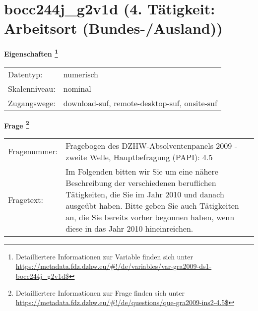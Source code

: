 
    \setcounter{footnote}{0}

    \vspace*{-1.8cm}
	\section{bocc244j\_g2v1d (4. Tätigkeit: Arbeitsort (Bundes-/Ausland))}
	\label{section:bocc244j_g2v1d}



    \vspace*{0.5cm}
    \noindent\textbf{Eigenschaften
	\footnote{Detailliertere Informationen zur Variable finden sich unter
		\url{https://metadata.fdz.dzhw.eu/\#!/de/variables/var-gra2009-ds1-bocc244j_g2v1d$}}}\\
	\begin{tabularx}{\hsize}{@{}lX}
	Datentyp: & numerisch \\
	Skalenniveau: & nominal \\
	Zugangswege: &
	  download-suf, 
	  remote-desktop-suf, 
	  onsite-suf
 \\
    \end{tabularx}



				\vspace*{0.5cm}
                \noindent\textbf{Frage
	                \footnote{Detailliertere Informationen zur Frage finden sich unter
		              \url{https://metadata.fdz.dzhw.eu/\#!/de/questions/que-gra2009-ins2-4.5$}}}\\
				\begin{tabularx}{\hsize}{@{}lX}
					Fragenummer: &
					  Fragebogen des DZHW-Absolventenpanels 2009 - zweite Welle, Hauptbefragung (PAPI):
					  4.5
 \\
					Fragetext: & Im Folgenden bitten wir Sie um eine nähere Beschreibung der verschiedenen beruflichen Tätigkeiten, die Sie im Jahr 2010 und danach ausgeübt haben. Bitte geben Sie auch Tätigkeiten an, die Sie bereits vorher begonnen haben, wenn diese in das Jahr 2010 hineinreichen. \\
				\end{tabularx}






